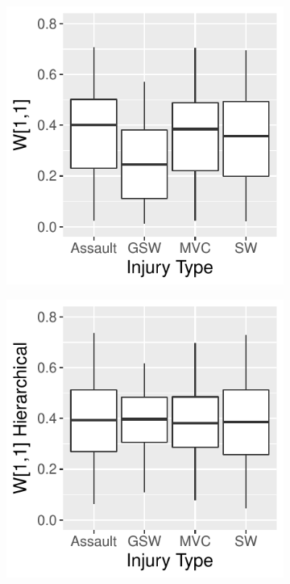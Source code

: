 \documentclass{article}
\begin{document}
\begin{figure}
    \centering
    \begin{subfigure}[b]{0.22\textwidth}
        \includegraphics[width=\textwidth]{shrinkageSep.pdf}
        \caption{}
        \label{fig:nonHierPosteriors}
    \end{subfigure}
    \quad %
    \begin{subfigure}[b]{0.22\textwidth}
        \includegraphics[width=\textwidth]{shrinkageHier.pdf}

\end{subfigure}
\end{figure}
\end{document}

